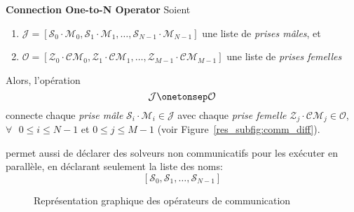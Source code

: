 \begin{lemma}\label{res_op_conn:1ton}
{\bf Connection One-to-N Operator} Soient 
\begin{enumerate} 
\item $\mathcal{J} = \left[\mathcal{S}_0\cdot \mathcal{M}_0, \mathcal{S}_1\cdot \mathcal{M}_1,\dots, \mathcal{S}_{N-1}\cdot \mathcal{M}_{N-1}\right]$ une liste de  {\it prises mâles}, et
\item $\mathcal{O} = \left[\mathcal{Z}_0\cdot \mathcal{CM}_0, \mathcal{Z}_1\cdot \mathcal{CM}_1,\dots, \mathcal{Z}_{M-1}\cdot \mathcal{CM}_{M-1}\right]$ une liste de {\it prises femelles}
\end{enumerate} Alors, l'opération
\[
\mathcal{J} \onetonsep \mathcal{O}
\]
connecte chaque {\it prise mâle} $\mathcal{S}_i\cdot \mathcal{M}_i \in \mathcal{J}$ avec chaque {\it prise femelle} $\mathcal{Z}_j\cdot \mathcal{CM}_j \in \mathcal{O}$, $\forall\textbf{ }0 \leq i \leq N-1$ et $0 \leq j \leq M-1$ (voir Figure~\ref{res_subfig:comm_diff}).
\end{lemma}


\posl{} permet aussi de déclarer des solveurs non communicatifs pour les exécuter en parallèle, en déclarant seulement la liste des noms:
\[
\left[\mathcal{S}_0, \mathcal{S}_1, \dots, \mathcal{S}_{N-1}\right]
\]

\begin{figure}[t]
\centering
{}
\hspace{0.05\textwidth}%
\caption[]{Représentation graphique des opérateurs de communication}
\label{res_fig:comm}
\end{figure}